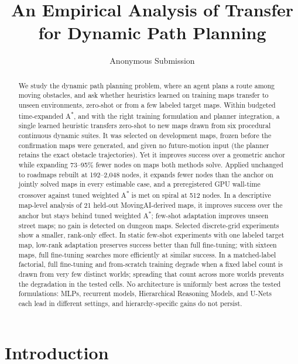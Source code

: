 \documentclass[letterpaper]{article} %
\title{An Empirical Analysis of Transfer for Dynamic Path Planning}
\author{
    Anonymous Submission
}
\begin{document}
\maketitle

\begin{abstract}
We study the dynamic path planning problem, where an agent plans a route among moving obstacles, and ask whether heuristics learned on training maps transfer to unseen environments, zero-shot or from a few labeled target maps. Within budgeted time-expanded A\textsuperscript{*}, and with the right training formulation and planner integration, a single learned heuristic transfers zero-shot to new maps drawn from six procedural continuous dynamic suites. It was selected on development maps, frozen before the confirmation maps were generated, and given no future-motion input (the planner retains the exact obstacle trajectories). Yet it improves success over a geometric anchor while expanding 73--95\% fewer nodes on maps both methods solve. Applied unchanged to roadmaps rebuilt at 192--2{,}048 nodes, it expands fewer nodes than the anchor on jointly solved maps in every estimable case, and a preregistered GPU wall-time crossover against tuned weighted A\textsuperscript{*} is met on spiral at 512 nodes. In a descriptive map-level analysis of 21 held-out MovingAI-derived maps, it improves success over the anchor but stays behind tuned weighted A\textsuperscript{*}; few-shot adaptation improves unseen street maps; no gain is detected on dungeon maps. Selected discrete-grid experiments show a smaller, rank-only effect. In static few-shot experiments with one labeled target map, low-rank adaptation preserves success better than full fine-tuning; with sixteen maps, full fine-tuning searches more efficiently at similar success. In a matched-label factorial, full fine-tuning and from-scratch training degrade when a fixed label count is drawn from very few distinct worlds; spreading that count across more worlds prevents the degradation in the tested cells. No architecture is uniformly best across the tested formulations: MLPs, recurrent models, Hierarchical Reasoning Models, and U-Nets each lead in different settings, and hierarchy-specific gains do not persist.
\end{abstract}

\section{Introduction}
\end{document}
